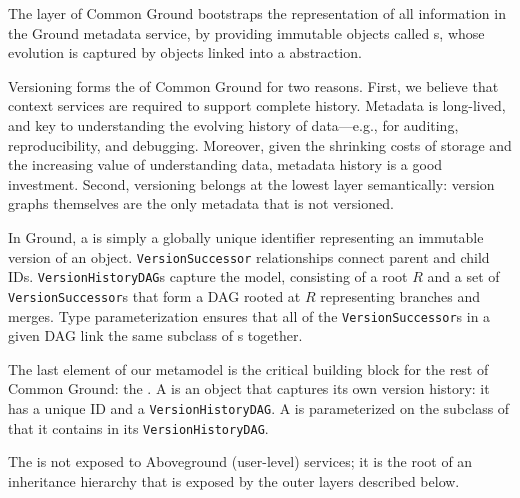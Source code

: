 \documentclass{sig-alternate}
\begin{document}
The \core layer of Common Ground bootstraps the representation of all information in the Ground metadata service, by providing immutable objects called {\thing}s, whose evolution is captured by {\version} objects linked into a \emph{\versiongraph} abstraction. 

Versioning forms the \core of Common Ground for two reasons.  First, we believe that  context services are required to support complete history. Metadata is long-lived, and key to understanding the evolving history of data---e.g., for auditing, reproducibility, and debugging. Moreover, given the shrinking costs of storage and the increasing value of understanding data, metadata history is a good investment.
Second, versioning belongs at the lowest layer semantically: version graphs themselves are the only metadata that is not versioned.

In Ground, a \version is simply a globally unique identifier representing an immutable version of an object.
\texttt{VersionSuccessor} relationships connect parent and child \version IDs.
\texttt{VersionHistoryDAG}s capture the \versiongraph model, consisting of a root \version $R$ 
and a set of \texttt{VersionSuccessor}s that form a DAG rooted at $R$ 
representing branches and merges.
Type parameterization ensures that all of the \texttt{VersionSuccessor}s in a given DAG link the same subclass of {\version}s together.

The last element of our \core metamodel is the critical building block for
the rest of Common Ground: the \thing. A
\thing is an object that captures its own version history: it has a
unique ID and a \texttt{VersionHistoryDAG}. A \thing is parameterized on the subclass of
\version that it contains in its \texttt{VersionHistoryDAG}.  


The \core is not exposed to Aboveground (user-level) services; it is the root of an inheritance hierarchy that is exposed by the outer layers described below.  
\end{document}
